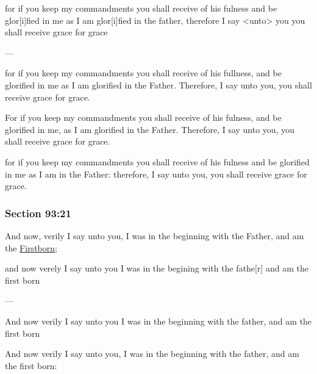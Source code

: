 		\begin{framed}
		\scriptsize
			\begin{compactdesc}
				\item[JSP] for if you keep my commandments you shall receive of his fulness and be glor[i]fied in me as I am glor[i]fied in the father, therefore I say <unto> you you shall receive grace for grace
				\item[BC] ---
				\item[RB2] for if you keep my commandments you shall receive of his fullness, and be glorified in me as I am glorified in the Father. Therefore, I say unto you, you shall receive grace for grace.
				\item[RB1] For if you keep my commandments you shall receive of his fulness, and be glorified in me, as I am glorified in the Father. Therefore, I say unto you, you shall receive grace for grace. 
				\item[DC 1835] for if you keep my commandments you shall receive of his fulness and be glorified in me as I am in the Father: therefore, I say unto you, you shall receive grace for grace. 
			\end{compactdesc}
		\end{framed}

	\subsubsection{Section 93:21} %
		\label{DC93-21}

		And now, verily I say unto you, I was in the beginning with the Father, and am the \hyperref[FIRSTBORN]{Firstborn};

		\begin{framed}
		\scriptsize
			\begin{compactdesc}
				\item[JSP] and now verely I say unto you I was in the begining with the fathe[r] and am the first born
				\item[BC] ---
				\item[RB2]  And now verily I say unto you I was in the beginning with the father, and am the first born 
				\item[RB1] And now verily I say unto you, I was in the beginning with the father, and am the first born: 
			\end{compactdesc}
		\end{framed}

